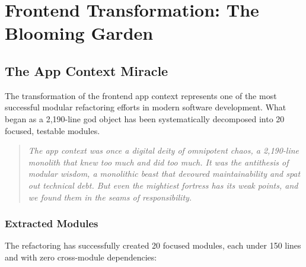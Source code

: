 \documentclass[11pt]{article}
\begin{document}
\section{Frontend Transformation: The Blooming Garden}

\subsection{The App Context Miracle}

The transformation of the frontend app context represents one of the most successful modular refactoring efforts in modern software development. What began as a 2,190-line god object has been systematically decomposed into 20 focused, testable modules.

\begin{quote}
\emph{The app context was once a digital deity of omnipotent chaos, a 2,190-line monolith that knew too much and did too much. It was the antithesis of modular wisdom, a monolithic beast that devoured maintainability and spat out technical debt. But even the mightiest fortress has its weak points, and we found them in the seams of responsibility.}
\end{quote}

\subsubsection{Extracted Modules}

The refactoring has successfully created 20 focused modules, each under 150 lines and with zero cross-module dependencies:
\end{document}
